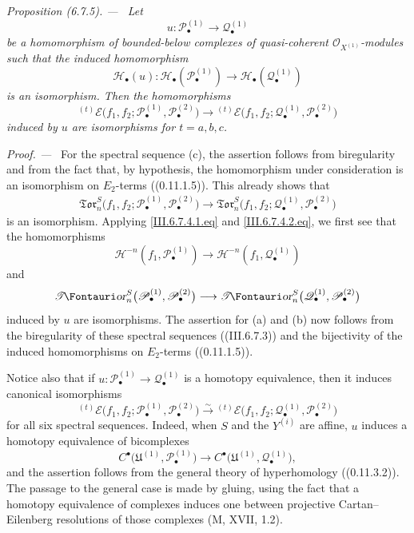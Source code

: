 \documentclass[10pt,oneside]{book}
\newcommand{\sh}[1]{\mathscr{#1}}
\newcommand{\shTor}{\sh{T}\textup{\kern-2.2pt{\Fontauri\slshape or}}}
\newcommand{\sref}[2][]{(#2)}
\newenvironment{proposition}[1][]{\par\medskip\noindent\itshape Proposition (#1). ---\ }{\par}
\newenvironment{proof}{\par\medskip\noindent\textit{Proof. ---\ }}{\par}
\begin{document}
\begin{proposition}[6.7.5]
\label{III.6.7.5}
Let
\[
  u:\sh P_\bullet^{(1)}
  \longrightarrow
  \sh Q_\bullet^{(1)}
\]
be a homomorphism of bounded-below complexes of quasi-coherent
$\sh O_{X^{(1)}}$-modules such that the induced homomorphism
\[
  \sh H_\bullet(u):
  \sh H_\bullet(\sh P_\bullet^{(1)})
  \longrightarrow
  \sh H_\bullet(\sh Q_\bullet^{(1)})
\]
is an isomorphism.  Then the homomorphisms
\[
  {}^{(t)}\sh E
  \bigl(
    f_1,f_2;
    \sh P_\bullet^{(1)},\sh P_\bullet^{(2)}
  \bigr)
  \longrightarrow
  {}^{(t)}\sh E
  \bigl(
    f_1,f_2;
    \sh Q_\bullet^{(1)},\sh P_\bullet^{(2)}
  \bigr)
\]
induced by $u$ are isomorphisms for $t=a,b,c$.
\end{proposition}

\begin{proof}
For the spectral sequence \textnormal{(c)}, the assertion follows
from biregularity and from the fact that, by hypothesis, the
homomorphism under consideration is an isomorphism on
$E_2$-terms (\sref[0]{0.11.1.5}).  This already shows that
\[
\begin{split}
  \mathfrak{Tor}_n^S
  \bigl(
    f_1,f_2;
    \sh P_\bullet^{(1)},\sh P_\bullet^{(2)}
  \bigr)
  \longrightarrow
  \mathfrak{Tor}_n^S
  \bigl(
    f_1,f_2;
    \sh Q_\bullet^{(1)},\sh P_\bullet^{(2)}
  \bigr)
\end{split}
\]
is an isomorphism.  Applying \eqref{III.6.7.4.1.eq} and
\eqref{III.6.7.4.2.eq}, we first see that the homomorphisms
\[
  \sh H^{-n}(f_1,\sh P_\bullet^{(1)})
  \longrightarrow
  \sh H^{-n}(f_1,\sh Q_\bullet^{(1)})
\]
and
\[
  \shTor_n^S
  \bigl(
    \sh P_\bullet^{(1)},\sh P_\bullet^{(2)}
  \bigr)
  \longrightarrow
  \shTor_n^S
  \bigl(
    \sh Q_\bullet^{(1)},\sh P_\bullet^{(2)}
  \bigr)
\]
induced by $u$ are isomorphisms.  The assertion for
\textnormal{(a)} and \textnormal{(b)} now follows from the
biregularity of these spectral sequences
(\sref{III.6.7.3}) and the bijectivity of the induced
homomorphisms on $E_2$-terms (\sref[0]{0.11.1.5}).

Notice also that if
$u:\sh P_\bullet^{(1)}\to\sh Q_\bullet^{(1)}$ is a homotopy
equivalence, then it induces canonical isomorphisms
\[
  {}^{(t)}\sh E
  \bigl(
    f_1,f_2;
    \sh P_\bullet^{(1)},\sh P_\bullet^{(2)}
  \bigr)
  \xrightarrow{\sim}
  {}^{(t)}\sh E
  \bigl(
    f_1,f_2;
    \sh Q_\bullet^{(1)},\sh P_\bullet^{(2)}
  \bigr)
\]
for all six spectral sequences.  Indeed, when $S$ and the
$Y^{(i)}$ are affine, $u$ induces a homotopy equivalence of
bicomplexes
\[
  C^\bullet
  \bigl(
    \mathfrak U^{(1)},\sh P_\bullet^{(1)}
  \bigr)
  \longrightarrow
  C^\bullet
  \bigl(
    \mathfrak U^{(1)},\sh Q_\bullet^{(1)}
  \bigr),
\]
and the assertion follows from the general theory of
hyperhomology (\sref[0]{0.11.3.2}).  The passage to the general
case is made by gluing, using the fact that a homotopy
equivalence of complexes induces one between projective
Cartan--Eilenberg resolutions of those complexes
(\textnormal{M}, XVII, 1.2).
\end{proof}
\end{document}

